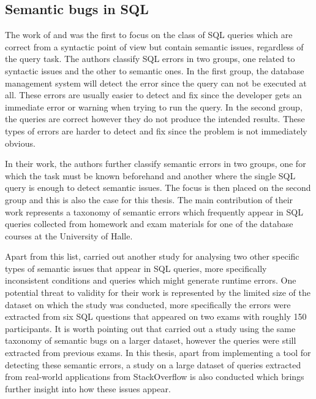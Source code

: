 \subsection{Semantic bugs in SQL}

The work of \citet{P001} and \citet{P002} was the first to focus on the class of SQL queries which are correct from a syntactic point of view but contain semantic issues, regardless of the query task. The authors classify SQL errors in two groups, one related to syntactic issues and the other to semantic ones. In the first group, the database management system will detect the error since the query can not be executed at all. These errors are usually easier to detect and fix since the developer gets an immediate error or warning when trying to run the query. In the second group, the queries are correct however they do not produce the intended results. These types of errors are harder to detect and fix since the problem is not immediately obvious.

In their work, the authors further classify semantic errors in two groups, one for which the task must be known beforehand and another where the single SQL query is enough to detect semantic issues. The focus is then placed on the second group and this is also the case for this thesis. The main contribution of their work represents a taxonomy of semantic errors which frequently appear in SQL queries collected from homework and exam materials for one of the database courses at the University of Halle. 

Apart from this list, \citet{P019} carried out another study for analysing two other specific types of semantic issues that appear in SQL queries, more specifically inconsistent conditions and queries which might generate runtime errors. One potential threat to validity for their work is represented by the limited size of the dataset on which the study was conducted, more specifically the errors were extracted from six SQL questions that appeared on two exams with roughly 150 participants. It is worth pointing out that \citet{P003} carried out a study using the same taxonomy of semantic bugs on a larger dataset, however the queries were still extracted from previous exams. In this thesis, apart from implementing a tool for detecting these semantic errors, a study on a large dataset of queries extracted from real-world applications from StackOverflow is also conducted which brings further insight into how these issues appear.

